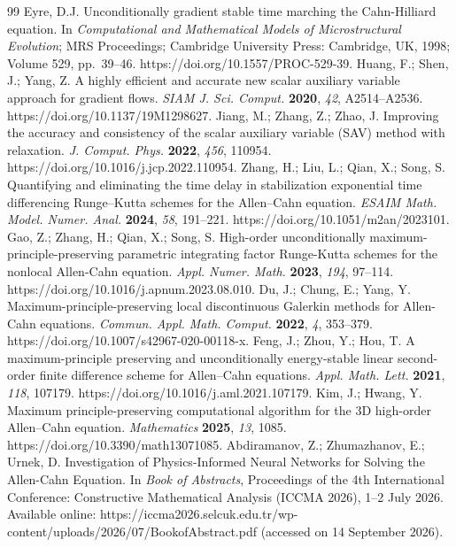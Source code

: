 \begin{thebibliography}{99}
 Eyre, D.J. Unconditionally gradient stable time marching the Cahn-Hilliard equation. In \textit{Computational and Mathematical Models of Microstructural Evolution}; MRS Proceedings; Cambridge University Press: Cambridge, UK, 1998; Volume 529, pp.\ 39--46. https://doi.org/10.1557/PROC-529-39.
 Huang, F.; Shen, J.; Yang, Z. A highly efficient and accurate new scalar auxiliary variable approach for gradient flows. \textit{SIAM J. Sci. Comput.} \textbf{2020}, \textit{42}, A2514--A2536. https://doi.org/10.1137/19M1298627.
 Jiang, M.; Zhang, Z.; Zhao, J. Improving the accuracy and consistency of the scalar auxiliary variable (SAV) method with relaxation. \textit{J. Comput. Phys.} \textbf{2022}, \textit{456}, 110954. https://doi.org/10.1016/j.jcp.2022.110954.
 Zhang, H.; Liu, L.; Qian, X.; Song, S. Quantifying and eliminating the time delay in stabilization exponential time differencing Runge--Kutta schemes for the Allen--Cahn equation. \textit{ESAIM Math. Model. Numer. Anal.} \textbf{2024}, \textit{58}, 191--221. https://doi.org/10.1051/m2an/2023101.
 Gao, Z.; Zhang, H.; Qian, X.; Song, S. High-order unconditionally maximum-principle-preserving parametric integrating factor Runge-Kutta schemes for the nonlocal Allen-Cahn equation. \textit{Appl. Numer. Math.} \textbf{2023}, \textit{194}, 97--114. https://doi.org/10.1016/j.apnum.2023.08.010.
 Du, J.; Chung, E.; Yang, Y. Maximum-principle-preserving local discontinuous Galerkin methods for Allen-Cahn equations. \textit{Commun. Appl. Math. Comput.} \textbf{2022}, \textit{4}, 353--379. https://doi.org/10.1007/s42967-020-00118-x.
 Feng, J.; Zhou, Y.; Hou, T. A maximum-principle preserving and unconditionally energy-stable linear second-order finite difference scheme for Allen--Cahn equations. \textit{Appl. Math. Lett.} \textbf{2021}, \textit{118}, 107179. https://doi.org/10.1016/j.aml.2021.107179.
 Kim, J.; Hwang, Y. Maximum principle-preserving computational algorithm for the 3D high-order Allen--Cahn equation. \textit{Mathematics} \textbf{2025}, \textit{13}, 1085. https://doi.org/10.3390/math13071085.
 Abdiramanov, Z.; Zhumazhanov, E.; Urnek, D. Investigation of Physics-Informed Neural Networks for Solving the Allen-Cahn Equation. In \textit{Book of Abstracts}, Proceedings of the 4th International Conference: Constructive Mathematical Analysis (ICCMA 2026), 1--2 July 2026. Available online: https://iccma2026.selcuk.edu.tr/wp-content/uploads/2026/07/BookofAbstract.pdf (accessed on 14 September 2026).

\end{thebibliography}
